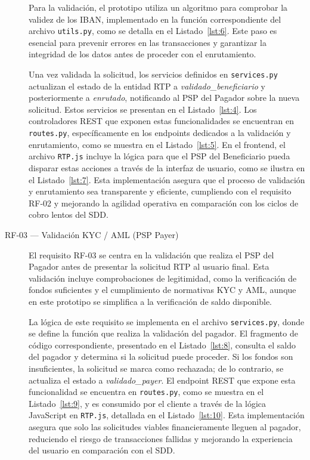 \begin{description}
Para la validación, el prototipo utiliza un algoritmo para comprobar la validez de los IBAN, implementado en la función correspondiente del archivo \texttt{utils.py}, como se detalla en el Listado~\ref{lst:6}. Este paso es esencial para prevenir errores en las transacciones y garantizar la integridad de los datos antes de proceder con el enrutamiento.

Una vez validada la solicitud, los servicios definidos en \texttt{services.py} actualizan el estado de la entidad RTP a \textit{validado\_beneficiario} y posteriormente a \textit{enrutado}, notificando al PSP del Pagador sobre la nueva solicitud. Estos servicios se presentan en el Listado~\ref{lst:4}. Los controladores REST que exponen estas funcionalidades se encuentran en \texttt{routes.py}, específicamente en los endpoints dedicados a la validación y enrutamiento, como se muestra en el Listado~\ref{lst:5}. En el frontend, el archivo \texttt{RTP.js} incluye la lógica para que el PSP del Beneficiario pueda disparar estas acciones a través de la interfaz de usuario, como se ilustra en el Listado~\ref{lst:7}. Esta implementación asegura que el proceso de validación y enrutamiento sea transparente y eficiente, cumpliendo con el requisito RF-02 y mejorando la agilidad operativa en comparación con los ciclos de cobro lentos del SDD.

\item[RF-03 — Validación KYC / AML (PSP Payer)]  
El requisito RF-03 se centra en la validación que realiza el PSP del Pagador antes de presentar la solicitud RTP al usuario final. Esta validación incluye comprobaciones de legitimidad, como la verificación de fondos suficientes y el cumplimiento de normativas KYC y AML, aunque en este prototipo se simplifica a la verificación de saldo disponible.

La lógica de este requisito se implementa en el archivo \texttt{services.py}, donde se define la función que realiza la validación del pagador. El fragmento de código correspondiente, presentado en el Listado~\ref{lst:8}, consulta el saldo del pagador y determina si la solicitud puede proceder. Si los fondos son insuficientes, la solicitud se marca como rechazada; de lo contrario, se actualiza el estado a \textit{validado\_payer}. El endpoint REST que expone esta funcionalidad se encuentra en \texttt{routes.py}, como se muestra en el Listado~\ref{lst:9}, y es consumido por el cliente a través de la lógica JavaScript en \texttt{RTP.js}, detallada en el Listado~\ref{lst:10}. Esta implementación asegura que solo las solicitudes viables financieramente lleguen al pagador, reduciendo el riesgo de transacciones fallidas y mejorando la experiencia del usuario en comparación con el SDD.


\end{description}
